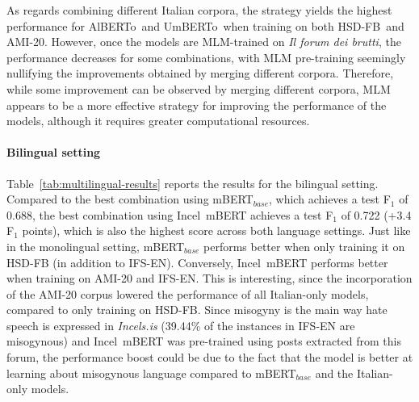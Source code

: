 \documentclass[11pt]{article}
\newcommand{\dsITcorpus}{IFU-22-IT}
\newcommand{\dsENclassification}{IFS-EN}
\newcommand{\mbert}{\mbox{mBERT$_{base}$}}
\newcommand{\imbert}{\mbox{Incel mBERT}}
\newcommand{\umbert}{\mbox{UmBERTo}}
\newcommand{\albert}{\mbox{AlBERTo}}
\newcommand{\iumbert}{\mbox{Incel UmBERTo}}
\newcommand{\ialbert}{\mbox{Incel AlBERTo}}
\newcommand{\hsdfb}{\mbox{HSD-FB}}
\newcommand{\hsdtw}{\mbox{HSD-TW}}
\newcommand{\ami}{\mbox{AMI-20}}
\newcommand{\enforum}{\textit{Incels.is}}
\newcommand{\itforum}{\textit{Il forum dei brutti}}
\begin{document}
As regards combining different Italian corpora, the strategy yields the highest performance for \albert\, and \umbert\, when training on both \hsdfb\, and \ami.
However, once the models are MLM-trained on \itforum, the performance decreases for some combinations, with MLM pre-training seemingly nullifying the improvements obtained by merging different corpora. Therefore, while some improvement can be observed by merging different corpora, MLM appears to be a more effective strategy for improving the performance of the models, although it requires greater computational resources.

\paragraph{Bilingual setting}
Table~\ref{tab:multilingual-results} reports the results for the bilingual setting.
Compared to the best combination using \mbert, which achieves a test F$_1$ of 0.688, the best combination using \imbert{} achieves a test F$_1$ of 0.722 (+3.4 F$_1$ points), which is also the highest score across both language settings. Just like in the monolingual setting, \mbert{} performs better when only training it on \hsdfb{} (in addition to \dsENclassification). Conversely, \imbert{} performs better when training on \ami{} and \dsENclassification. This is interesting, since the incorporation of the \ami{} corpus lowered the performance of all Italian-only models, compared to only training on \hsdfb. Since misogyny is the main way hate speech is expressed in \enforum{} (39.44\% of the instances in \dsENclassification{} are misogynous) and
\imbert{} was pre-trained using posts extracted from this forum, the performance boost could be due to the fact that the model is better at learning about misogynous language compared to \mbert{} and the Italian-only models.
\end{document}
